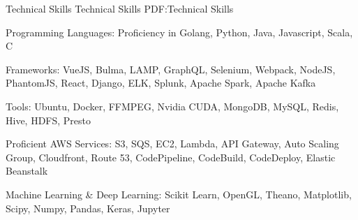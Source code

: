 \documentclass[letterpaper,MMMyyyy,nonstopmode]{simpleresumecv}
\begin{document}
\begin{Body}







\Section
{Technical Skills}
{Technical Skills}
{PDF:Technical Skills}

\BulletItem
Programming Languages: Proficiency in Golang, Python, Java, Javascript, Scala, C

\Gap
\BulletItem
Frameworks: VueJS, Bulma, LAMP, GraphQL, Selenium, Webpack, NodeJS, PhantomJS, React, Django, ELK, Splunk, Apache Spark, Apache Kafka

\Gap
\BulletItem
Tools: Ubuntu, Docker, FFMPEG, Nvidia CUDA, MongoDB, MySQL, Redis, Hive, HDFS, Presto

\Gap
\BulletItem
Proficient AWS Services: S3, SQS, EC2, Lambda, API Gateway, Auto Scaling Group, Cloudfront, Route 53, CodePipeline, CodeBuild, CodeDeploy, Elastic Beanstalk

\Gap
\BulletItem
Machine Learning \& Deep Learning: Scikit Learn, OpenGL, Theano, Matplotlib, Scipy, Numpy, Pandas, Keras, Jupyter

\end{Body}
\end{document}

